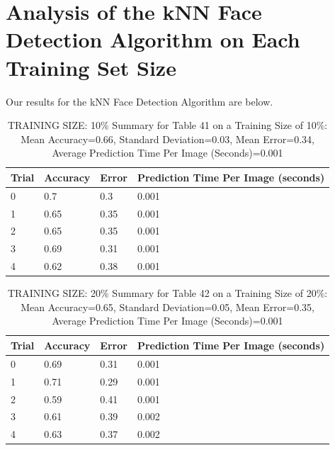 \documentclass{article}
\begin{document}

\section{Analysis of the kNN Face Detection Algorithm on Each Training Set Size}

Our results for the kNN Face Detection Algorithm are below.\\

\begin{table}[H]

\centering
{\begin{tabular}{||p{1cm}|p{1.8cm}|p{1.8cm}|p{3cm}||}
 \hline
Trial & Accuracy & Error & Prediction Time Per Image (seconds) \\ [0.5ex] 
 \hline\hline
    0  & 0.7  & 0.3  & 0.001\\
\hline
    1  & 0.65  & 0.35  & 0.001\\
\hline
    2  & 0.65  & 0.35  & 0.001\\
\hline
    3  & 0.69  & 0.31  & 0.001\\
\hline
    4  & 0.62  & 0.38  & 0.001\\
\hline
\end{tabular}}
\caption{TRAINING SIZE: 10\% \newline Summary for Table 41 on a Training Size of 10\%: Mean Accuracy=0.66, Standard Deviation=0.03, Mean Error=0.34, Average Prediction Time Per Image (Seconds)=0.001}
\end{table} 

\begin{table}[H]

\centering
{\begin{tabular}{||p{1cm}|p{1.8cm}|p{1.8cm}|p{3cm}||}
 \hline
Trial & Accuracy & Error & Prediction Time Per Image (seconds) \\ [0.5ex] 
 \hline\hline
    0  & 0.69  & 0.31  & 0.001\\
\hline
    1  & 0.71  & 0.29  & 0.001\\
\hline
    2  & 0.59  & 0.41  & 0.001\\
\hline
    3  & 0.61  & 0.39  & 0.002\\
\hline
    4  & 0.63  & 0.37  & 0.002\\
\hline

\end{tabular}}
\caption{TRAINING SIZE: 20\% \newline Summary for Table 42 on a Training Size of 20\%: Mean Accuracy=0.65, Standard Deviation=0.05, Mean Error=0.35, Average Prediction Time Per Image (Seconds)=0.001}
\end{table} 
\end{document}
